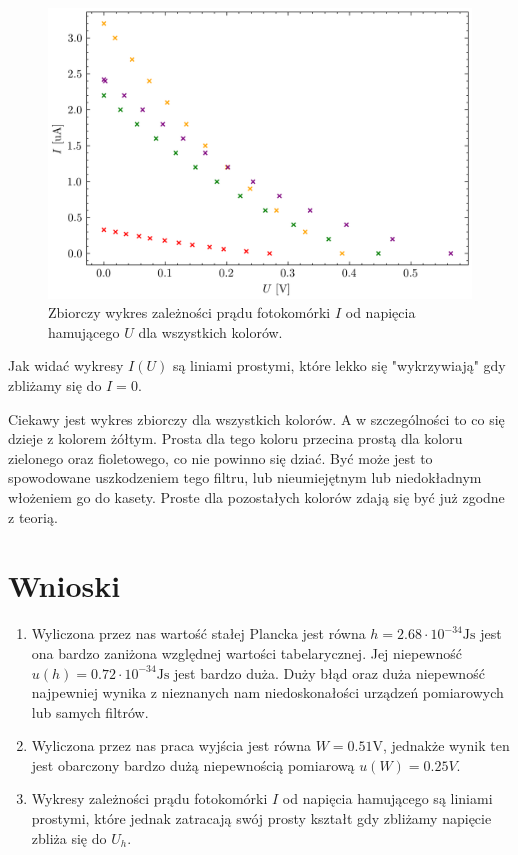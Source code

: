 \documentclass{fizykalab}
\newcommand{\volt}{\ensuremath{\text{V}}}
\newcommand{\Js}{\ensuremath{\text{Js}}}
\begin{document}
\begin{figure}[H]
    \centering
    \includegraphics[width=0.75\linewidth]{allColors.png}
    \caption{Zbiorczy wykres zależności prądu fotokomórki $I$ od napięcia hamującego $U$
    dla wszystkich kolorów.
    }
\end{figure}

Jak widać wykresy $I(U)$ są
liniami prostymi, które
lekko się "wykrzywiają" gdy zbliżamy się do 
$I = 0$.

Ciekawy jest wykres zbiorczy dla wszystkich kolorów.
A w szczególności to co się dzieje z
kolorem żółtym. Prosta dla tego koloru
przecina prostą dla koloru zielonego oraz fioletowego,
co nie powinno się dziać.
Być może jest to spowodowane uszkodzeniem tego filtru,
lub nieumiejętnym lub niedokładnym włożeniem go
do kasety. Proste dla pozostałych kolorów zdają 
się być już zgodne z teorią.

\section{Wnioski}

\begin{enumerate}
    \item Wyliczona przez nas wartość stałej Plancka jest równa
    $h = 2.68 \cdot 10^{-34} \Js$
    jest ona bardzo zaniżona względnej wartości tabelarycznej.
    Jej niepewność $u(h)  = 0.72 \cdot 10^{-34} \Js$ jest bardzo 
    duża.
    Duży błąd oraz duża niepewność 
    najpewniej wynika z nieznanych nam 
    niedoskonałości urządzeń pomiarowych lub
    samych filtrów.
    \item Wyliczona przez nas praca wyjścia jest równa
    $W = 0.51 \volt$, jednakże wynik ten jest obarczony bardzo dużą 
    niepewnością pomiarową $u(W) = 0.25V$.
    \item Wykresy zależności prądu fotokomórki $I$ od 
    napięcia hamującego są liniami prostymi, 
    które jednak zatracają swój prosty
    kształt gdy zbliżamy napięcie zbliża się 
    do $U_h$.
    
    

    
\end{enumerate}
\end{document}
